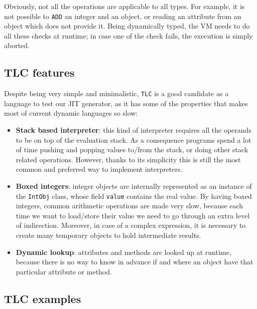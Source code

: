 Obviously, not all the operations are applicable to all types. For example,
it is not possible to \lstinline{ADD} an integer and an object, or reading an
attribute from an object which does not provide it.  Being dynamically typed,
the VM needs to do all these checks at runtime; in case one of the check
fails, the execution is simply aborted.

\subsection{TLC features}
\label{sec:tlc-features}

Despite being very simple and minimalistic, \lstinline{TLC} is a good
candidate as a language to test our JIT generator, as it has some of the
properties that makes most of current dynamic languages so slow:

\begin{itemize}

\item \textbf{Stack based interpreter}: this kind of interpreter requires all the operands to be
  on top of the evaluation stack.  As a consequence programs spend a lot of
  time pushing and popping values to/from the stack, or doing other stack
  related operations.  However, thanks to its simplicity this is still the
  most common and preferred way to implement interpreters.

\item \textbf{Boxed integers}: integer objects are internally represented as
  an instance of the \lstinline{IntObj} class, whose field \lstinline{value}
  contains the real value.  By having boxed integers, common arithmetic
  operations are made very slow, because each time we want to load/store their
  value we need to go through an extra level of indirection.  Moreover, in
  case of a complex expression, it is necessary to create many temporary
  objects to hold intermediate results.

\item \textbf{Dynamic lookup}: attributes and methods are looked up at
  runtime, because there is no way to know in advance if and where an object
  have that particular attribute or method.
\end{itemize}


\subsection{TLC examples}

